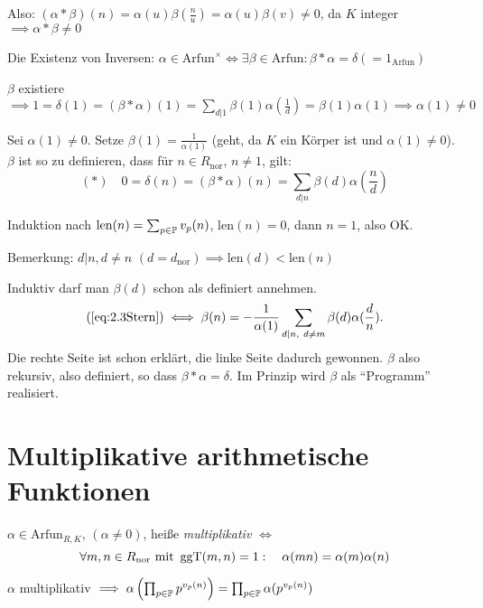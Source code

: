\documentclass[a4paper,DIV15,BCOR12mm]{article}
\begin{document}
\begin{beweis}
Also: $(\alpha * \beta)(n) = \alpha(u) \beta(\frac nu) = \alpha(u)
\beta(v) \ne 0$, da $K$ integer $\implies \alpha * \beta \ne 0 $

Die Existenz von Inversen: $\alpha \in \text{Arfun}^\times \iff
\exists \beta \in \text{Arfun}: \beta * \alpha = \delta
(=1_\text{Arfun})$

$\beta$ existiere $\implies 1 = \delta(1) = (\beta * \alpha)(1) =
\sum_{d|1} \beta(1) \alpha(\frac 1 d) = \beta(1) \alpha(1) \implies
\alpha(1) \ne 0$

Sei $\alpha(1) \ne 0$. Setze $\beta(1) = \frac 1 {\alpha(1)}$ (geht,
da $K$ ein Körper ist und $\alpha(1) \ne 0$). $\beta$ ist so zu
definieren, dass für $n\in R_\text{nor}$, $n\ne1$, gilt:
\begin{equation}\label{eq:2.3Stern}
    (*) \quad 0 = \delta(n) = (\beta * \alpha)(n) = \sum_{d|n}
\beta(d) \alpha(\frac nd)
\end{equation}

Induktion nach $\text{len}(n) = \sum_{p\in\mathbb{P}} v_p(n)$,
$\text{len}(n) = 0$, dann $n=1$, also OK.

Bemerkung: $d|n, d\ne n$ $(d=d_\text{nor}) \implies \text{len}(d) <
\text{len}(n)$

Induktiv darf man $\beta(d)$ schon als definiert annehmen.
$$(\ref{eq:2.3Stern}) \iff \beta(n) = -\frac 1 {\alpha(1)}
\sum_{d|n,\ d\ne m} \beta(d)\alpha(\frac d n).$$ Die rechte Seite
ist schon erklärt, die linke Seite dadurch gewonnen. $\beta$ also
rekursiv, also definiert, so dass $\beta * \alpha = \delta$. Im
Prinzip wird $\beta$ als "`Programm"' realisiert.

\end{beweis}
\section{Multiplikative arithmetische Funktionen}

\begin{definition}
$\alpha \in \text{Arfun}_{R,K}$, $(\alpha\ne 0)$, heiße
\emph{multiplikativ} $\iff$
\[ \forall m,n \in R_\text{nor}\text{ mit }\mathop{\rm ggT}\nolimits(m,n)=1 :\quad  \alpha(mn) = \alpha(m) \alpha(n) \]
\end{definition}
$\alpha$ multiplikativ $\implies \alpha\left(\prod_{p\in\mathbb{P}}
p^{v_p(n)}\right) = \prod_{p\in\mathbb{P}} \alpha(p^{v_p(n)})$
\end{document}
